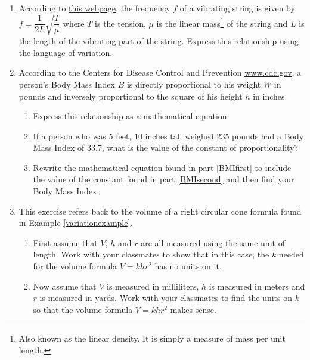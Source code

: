 \begin{enumerate}
\setcounter{enumi}{\value{HW}}

\item According to \href{http://en.wikipedia.org/wiki/Vibrating_string}{\underline{this webpage}}, the frequency $f$ of a vibrating string is given by $f = \dfrac{1}{2L} \sqrt{\dfrac{T}{\mu}}$ where $T$ is the tension, $\mu$ is the linear mass\footnote{Also known as the linear density.  It is simply a measure of mass per unit length.} of the string and $L$ is the length of the vibrating part of the string.  Express this relationship using the language of variation.

\item According to the Centers for Disease Control and Prevention \href{http://www.cdc.gov}{\underline{www.cdc.gov}}, a person's Body Mass Index $B$ is directly proportional to his weight $W$ in pounds and inversely proportional to the square of his height $h$ in inches. 

\begin{enumerate}

\item Express this relationship as a mathematical equation. \label{BMIfirst} 
\item If a person who was $5$ feet, $10$ inches tall weighed 235 pounds had a Body Mass Index of 33.7, what is the value of the constant of proportionality? \label{BMIsecond}
\item Rewrite the mathematical equation found in part \ref{BMIfirst} to include the value of the constant found in part \ref{BMIsecond} and then find your Body Mass Index.

\end{enumerate}

\item This exercise refers back to the volume of a right circular cone formula found in Example \ref{variationexample}.  

\begin{enumerate}

\item \label{coneexercisenounits} First assume that $V$, $h$ and $r$ are all measured using the same unit of length.  Work with your classmates to show that in this case, the $k$ needed for the volume formula $V = k h r^{2}$ has no units on it.

\item \label{coneexercisebadunits} Now assume that $V$ is measured in milliliters, $h$ is measured in meters and $r$ is measured in yards.  Work with your classmates to find the units on $k$ so that the volume formula $V = k h r^{2}$ makes sense.


\end{enumerate}
\end{enumerate}
